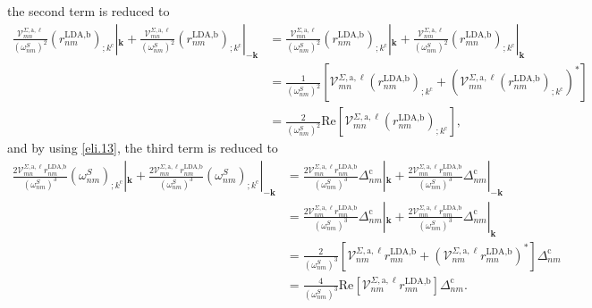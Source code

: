 the second term is reduced to
\begin{align}\label{second_term_gen_deriv}
    \frac{\mathcal{V}^{\Sigma,\text{a},\ell}_{mn}}{(\omega^{S}_{nm})^{2}}
    \left(r^{\text{LDA,b}}_{nm}\right)_{;k^{\text{c}}}|_{\mathbf{k}}
+   \frac{\mathcal{V}^{\Sigma,\text{a},\ell}_{mn}}{(\omega^{S}_{nm})^{2}}
    \left(r^{\text{LDA,b}}_{nm}\right)_{;k^{\text{c}}}|_{-\mathbf{k}}
&=  \frac{\mathcal{V}^{\Sigma,\text{a},\ell}_{mn}}{(\omega^{S}_{nm})^{2}}
    \left(r^{\text{LDA,b}}_{nm}\right)_{;k^{\text{c}}}|_{\mathbf{k}}
+   \frac{\mathcal{V}^{\Sigma,\text{a},\ell}_{nm}}{(\omega^{S}_{nm})^{2}}
    \left(r^{\text{LDA,b}}_{mn}\right)_{;k^{\text{c}}}|_{\mathbf{k}}\nonumber\\
&=  \frac{1}{(\omega^{S}_{nm})^{2}}
    \left[\mathcal{V}^{\Sigma,\text{a},\ell}_{mn}
    \left(r^{\text{LDA,b}}_{nm}\right)_{;k^{\text{c}}}
+   \left(\mathcal{V}^{\Sigma,\text{a},\ell}_{mn}
    \left(r^{\text{LDA,b}}_{nm}\right)_{;k^{\text{c}}}\right)^*\right]
    \nonumber\\
&=  \frac{2}{(\omega^{S}_{nm})^{2}}\mathrm{Re}
    \left[\mathcal{V}^{\Sigma,\text{a},\ell}_{mn}
    \left(r^{\text{LDA,b}}_{nm}\right)_{;k^{\text{c}}}\right]
,
\end{align}
and by using \eqref{eli.13}, the third term is reduced to
\begin{align}\label{third_term_gen_deriv}
    \frac{2\mathcal{V}^{\Sigma,\text{a},\ell}_{mn}
    r^{\text{LDA,b}}_{nm}}{(\omega^{S}_{nm})^{3}}
    \left(\omega^{S}_{nm}\right)_{;k^{\text{c}}}|_{\mathbf{k}}
+   \frac{2\mathcal{V}^{\Sigma,\text{a},\ell}_{mn}
    r^{\text{LDA,b}}_{nm}}{(\omega^{S}_{nm})^{3}}
    \left(\omega^{S}_{nm}\right)_{;k^{\text{c}}}|_{-\mathbf{k}}
&=  \frac{2\mathcal{V}^{\Sigma,\text{a},\ell}_{mn}
    r^{\text{LDA,b}}_{nm}}{(\omega^{S}_{nm})^{3}}
    \Delta_{nm}^{\text{c}}|_{\mathbf{k}}
+   \frac{2\mathcal{V}^{\Sigma,\text{a},\ell}_{mn}
    r^{\text{LDA,b}}_{nm}}{(\omega^{S}_{nm})^{3}}
    \Delta_{nm}^{\text{c}}|_{-\mathbf{k}}\nonumber\\
&=  \frac{2\mathcal{V}^{\Sigma,\text{a},\ell}_{nm}
    r^{\text{LDA,b}}_{mn}}{(\omega^{S}_{nm})^{3}}
    \Delta_{nm}^{\text{c}}|_{\mathbf{k}}
+   \frac{2\mathcal{V}^{\Sigma,\text{a},\ell}_{mn}
    r^{\text{LDA,b}}_{nm}}{(\omega^{S}_{nm})^{3}}
    \Delta_{nm}^{\text{c}}|_{\mathbf{k}}\nonumber\\
&=  \frac{2}{(\omega^{S}_{nm})^{3}}
    \left[\mathcal{V}^{\Sigma,\text{a},\ell}_{nm}r^{\text{LDA,b}}_{mn}
+   \left(\mathcal{V}^{\Sigma,\text{a},\ell}_{nm}
    r^{\text{LDA,b}}_{mn}\right)^{*}\right]\Delta_{nm}^{\text{c}}\nonumber\\
&=  \frac{4}{(\omega^{S}_{nm})^{3}}\mathrm{Re}
    \left[\mathcal{V}^{\Sigma,\text{a},\ell}_{nm}r^{\text{LDA,b}}_{mn}\right]
    \Delta_{nm}^{\text{c}}
.
\end{align}

